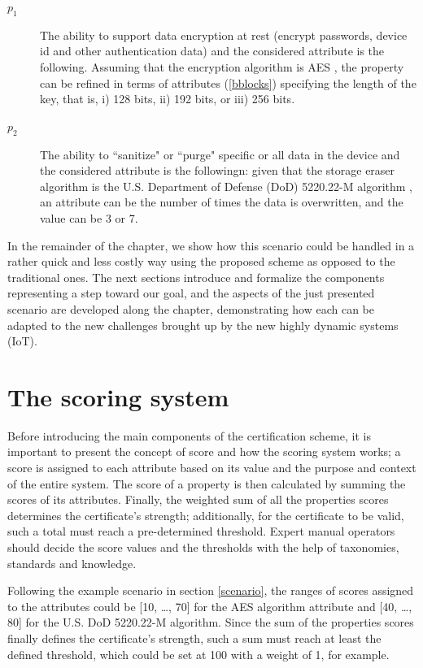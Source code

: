 \begin{description}
    \item[\(p_1\)] The ability to support data encryption at rest (encrypt passwords, device id and other authentication data) and the considered attribute is the following. Assuming that the encryption algorithm is AES \cite{daemen1999aes}, the property can be refined in terms of attributes (\ref{bblocks}) specifying the length of the key, that is, i) 128 bits, ii) 192 bits, or iii) 256 bits.
    
    \item[\(p_2\)] The ability to ``sanitize" or ``purge" specific or all data in the device and the considered attribute is the followingn: given that the storage eraser algorithm is the U.S. Department of Defense (DoD) 5220.22-M algorithm \cite{fischer2017dod}, an attribute can be the number of times the data is overwritten, and the value can be 3 or 7.
\end{description}


In the remainder of the chapter, we show how this scenario could be handled in a rather quick and less costly way using the proposed scheme as opposed to the traditional ones. The next sections introduce and formalize the components representing a step toward our goal, and the aspects of the just presented scenario are developed along the chapter, demonstrating how each can be adapted to the new challenges brought up by the new highly dynamic systems (IoT).


\section{The scoring system}
Before introducing the main components of the certification scheme, it is important to present the concept of score and how the scoring system works; a score is assigned to each attribute based on its value and the purpose and context of the entire system. The score of a property is then calculated by summing the scores of its attributes. Finally, the weighted sum of all the properties scores determines the certificate's strength; additionally, for the certificate to be valid, such a total must reach a pre-determined threshold. Expert manual operators should decide the score values and the thresholds with the help of taxonomies, standards and knowledge.

\begin{example}
\label{xmp:1}
Following the example scenario in section \ref{scenario}, the ranges of scores assigned to the attributes could be [10, \dots, 70] for the AES algorithm attribute and [40, \dots, 80] for the U.S. DoD 5220.22-M algorithm.
Since the sum of the properties scores finally defines the certificate's strength, such a sum must reach at least the defined threshold, which could be set at 100 with a weight of 1, for example.
\end{example}


